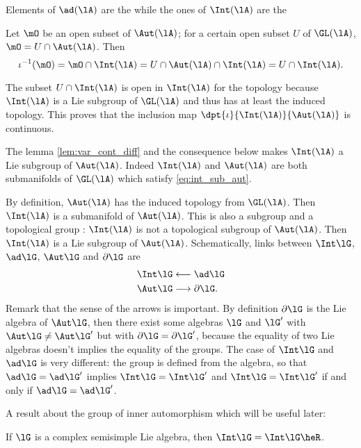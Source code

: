Elements of $\ad(\lA)$ are the  while the ones of $\Int(\lA)$ are the 

Let $\mO$ be an open subset of $\Aut(\lA)$; for a certain open subset $U$ of $\GL(\lA)$, $\mO=U\cap\Aut(\lA)$. Then
\begin{equation}
  \iota^{-1}(\mO)=\mO\cap\Int(\lA)
           =U\cap\Aut(\lA)\cap\Int(\lA)
       =U\cap\Int(\lA).
\end{equation}

The subset $U\cap\Int(\lA)$ is open in $\Int(\lA)$ for the topology because $\Int(\lA)$ is a Lie subgroup of $\GL(\lA)$ and thus has at least the induced topology. This proves that the inclusion map $\dpt{\iota}{\Int(\lA)}{\Aut(\lA)}$ is continuous.

The lemma \ref{lem:var_cont_diff} and the consequence below makes $\Int(\lA)$ a Lie subgroup of $\Aut(\lA)$. Indeed $\Int(\lA)$ and $\Aut(\lA)$ are both submanifolds of $\GL(\lA)$ which satisfy \eqref{eq:int_sub_aut}. 


By definition, $\Aut(\lA)$ has the induced topology from $\GL(\lA)$. Then $\Int(\lA)$ is a submanifold of $\Aut(\lA)$. 
This is also a subgroup and a topological group : $\Int(\lA)$ is not a topological subgroup of $\Aut(\lA)$. Then $\Int(\lA)$ is a Lie subgroup of $\Aut(\lA)$. Schematically, links between $\Int\lG$, $\ad\lG$, $\Aut\lG$ and $\partial\lG$ are
\begin{subequations}\label{eq:schem_ad_int}
\begin{align}
  \Int\lG&\longleftarrow\ad\lG\\
  \Aut\lG&\longrightarrow\partial\lG.
\end{align}
\end{subequations}
Remark that the sense of the arrows is important. By definition $\partial\lG$ is the Lie algebra of $\Aut\lG$, then there exist some algebras $\lG$ and $\lG'$ with $\Aut\lG\neq\Aut\lG'$ but with $\partial\lG=\partial\lG'$, because the equality of two Lie algebras doesn't implies the equality of the groups. The case of $\Int\lG$ and $\ad\lG$ is very different: the group is defined from the algebra, so that $\ad\lG=\ad\lG'$ implies $\Int\lG=\Int\lG'$ and $\Int\lG=\Int\lG'$ if and only if $\ad\lG=\ad\lG'$.

A result about the group of inner automorphism which will be useful later:

\begin{lemma}\label{lem:Int_g_gR}
If $\lG$ is a complex semisimple Lie algebra, then $\Int\lG=\Int\lG\heR$.
\end{lemma}

